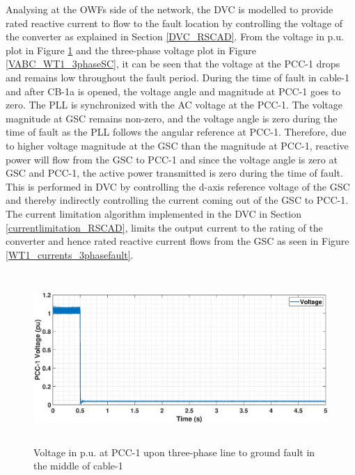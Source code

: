 Analysing at the \gls{OWF}s side of the network, the \gls{DVC} is modelled to provide rated reactive current to flow to the fault location by controlling the voltage of the converter as explained in Section \ref{DVC_RSCAD}. From the voltage in p.u. plot in Figure \ref{VACP_WT1_3phaseSC} and the three-phase voltage plot in Figure \ref{VABC_WT1_3phaseSC}, it can be seen that the voltage at the \gls{PCC}-1 drops and remains low throughout the fault period. During the time of fault in cable-1 and after CB-1a is opened, the voltage angle and magnitude at \gls{PCC}-1 goes to zero. The \gls{PLL} is synchronized with the \gls{AC} voltage at the \gls{PCC}-1. The voltage magnitude at \gls{GSC} remains non-zero, and the voltage angle is zero  during the time of fault as the \gls{PLL} follows the angular reference at \gls{PCC}-1. Therefore, due to higher voltage magnitude at the \gls{GSC} than the magnitude at \gls{PCC}-1, reactive power will flow from the \gls{GSC} to \gls{PCC}-1 and since the voltage angle is zero at \gls{GSC} and \gls{PCC}-1, the active power transmitted is zero during the time of fault. This is performed in \gls{DVC} by controlling the d-axis reference voltage of the \gls{GSC} and thereby indirectly controlling the current coming out of the \gls{GSC} to \gls{PCC}-1. The current limitation algorithm implemented in the \gls{DVC} in Section \ref{currentlimitation_RSCAD}, limits the output current to the rating of the converter and hence rated reactive current flows from the \gls{GSC} as seen in Figure \ref{WT1_currents_3phasefault}.



\begin{figure}[H]
    \includegraphics[height = 6.5cm,width = \textwidth]{Diagrams/Chapter_5/VACP_WT1_3phaseSC.eps}
    \caption{Voltage in p.u. at PCC-1 upon three-phase line to ground fault in the middle of cable-1}
    \label{VACP_WT1_3phaseSC}
\end{figure}

